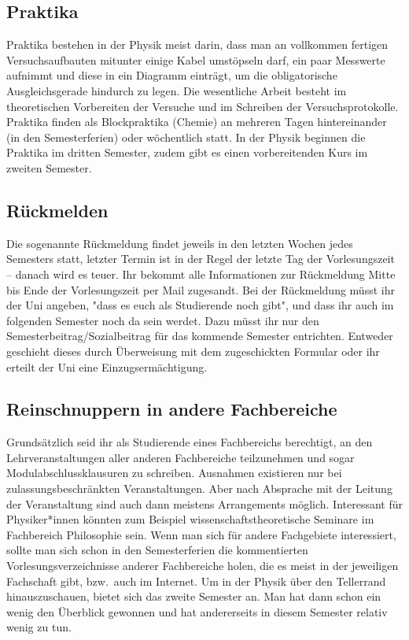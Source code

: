 \begin{multicols}{2}
\subsection{Praktika}
Praktika bestehen in der Physik meist darin, dass man an vollkommen fertigen Versuchsaufbauten mitunter einige Kabel umstöpseln darf, ein paar Messwerte aufnimmt und diese in ein Diagramm einträgt, um die obligatorische Ausgleichsgerade hindurch zu legen.
Die wesentliche Arbeit besteht im theoretischen Vorbereiten der Versuche und im Schreiben der Versuchsprotokolle.
Praktika finden als Blockpraktika (Chemie) an mehreren Tagen hintereinander (in den Semesterferien) oder wöchentlich statt.
In der Physik beginnen die Praktika im dritten Semester, zudem gibt es einen vorbereitenden Kurs im zweiten Semester.

\subsection{Rückmelden}
Die sogenannte Rückmeldung findet jeweils in den letzten Wochen jedes Semesters statt, letzter Termin ist in der Regel der letzte Tag der Vorlesungszeit -- danach wird es teuer.
Ihr bekommt alle Informationen zur Rückmeldung Mitte bis Ende der Vorlesungszeit per Mail zugesandt.
Bei der Rückmeldung müsst ihr der Uni angeben, "dass es euch als Studierende noch gibt", und dass ihr auch im folgenden Semester noch da sein werdet.
Dazu müsst ihr nur den Semesterbeitrag/Sozialbeitrag für das kommende Semester entrichten.
Entweder geschieht dieses durch Überweisung mit dem zugeschickten Formular oder ihr erteilt der Uni eine Einzugsermächtigung.

\subsection{Reinschnuppern in andere Fachbereiche}
Grundsätzlich seid ihr als Studierende
eines Fachbereichs berechtigt, an den Lehrveranstaltungen aller anderen Fachbereiche teilzunehmen und sogar Modulabschlussklausuren zu schreiben.
Ausnahmen existieren nur bei zulassungsbeschränkten Veranstaltungen.
Aber nach Absprache mit der Leitung der Veranstaltung sind auch dann meistens Arrangements möglich.
Interessant für Physiker*innen könnten zum Beispiel wissenschaftstheoretische Seminare im Fachbereich Philosophie sein.
Wenn man sich für andere Fachgebiete interessiert, sollte man sich schon in den Semesterferien die kommentierten Vorlesungsverzeichnisse anderer Fachbereiche holen, die es meist in der jeweiligen Fachschaft gibt, bzw.\ auch im Internet.
Um in der Physik über den Tellerrand hinauszuschauen, bietet sich das zweite Semester an.
Man hat dann schon ein wenig den Überblick gewonnen und hat andererseits in diesem Semester relativ wenig zu tun.

\end{multicols}
